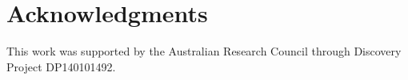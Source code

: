 \documentclass[12pt]{article}
\begin{document}






%
%
%
\section*{Acknowledgments}
%
This work was supported by the Australian Research Council through Discovery Project
DP140101492. 
%
%
%
%
%
\end{document}
